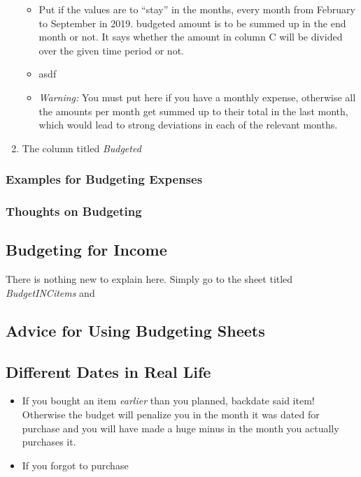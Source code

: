 \begin{enumerate}
	\begin{itemize}
		\item Put  if the values are to ``stay'' in the months, \ie every month from February to September in 2019.
		budgeted amount is to be summed up in the end month or not.
		It says whether the amount in column C will be divided over the given time period or not.
		\item asdf
		\item \emph{Warning:} You must put  here if you have a monthly expense, otherwise all the amounts per month get summed up to their total in the last month, which would lead to strong deviations in each of the relevant months.
	\end{itemize}
	\item The column titled \emph{Budgeted}
\end{enumerate}

\subsubsection{Examples for Budgeting Expenses}
\label{subsubsec:examples-budgeting-expenses}

\subsubsection{Thoughts on Budgeting}
\label{subsubsec:thoughts-on-budgeting}

\subsection{Budgeting for Income}
\label{subsec:budgeting-income}

There is nothing new to explain here.
Simply go to the sheet titled \emph{BudgetINCitems} and 

\subsection{Advice for Using Budgeting Sheets}
\label{subsec:advice-budgeting-sheets}

\subsection{Different Dates in Real Life}
\label{subsec:Different-Dates}

\begin{itemize}
	\item If you bought an item \emph{earlier} than you planned, backdate said item! Otherwise the budget will penalize you in the month it was dated for purchase and you will have made a huge minus in the month you actually purchases it.
	\item If you forgot to purchase 
\end{itemize}

